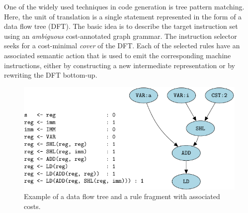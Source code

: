 One of the widely used techniques in code generation is tree pattern
matching. Here, the unit of translation is a single statement
represented in the form of a data flow tree (DFT). The basic idea is
to describe the target instruction set using an \emph{ambiguous}
cost-annotated graph grammar. The instruction selector seeks for a
cost-minimal \emph{cover} of the DFT. Each of the selected rules have
an associated semantic action that is used to emit the corresponding
machine instructions, either by constructing a new intermediate
representation or by rewriting the DFT bottom-up.
\begin{figure}[ht]
  \begin{center}



    \includegraphics{pgf-fig002}
  \end{center}
  \caption{Example of a data flow tree and a rule fragment with
    associated costs.}\label{fig:tpm}
\end{figure}

